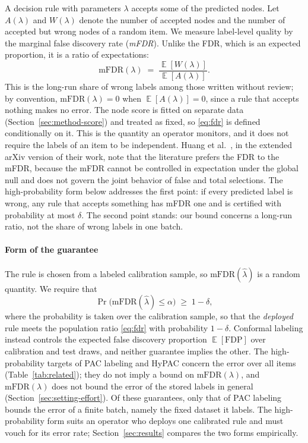 \documentclass[preprint,12pt]{elsarticle}
\theoremstyle{definition}
\newcommand{\fdr}{\mathrm{mFDR}}
\DeclareMathOperator{\E}{\mathbb{E}}
\begin{document}
A decision rule with parameters $\lambda$ accepts some of the predicted nodes.
Let $A(\lambda)$ and $W(\lambda)$ denote the number of accepted nodes and the
number of accepted but wrong nodes of a random item. We measure label-level
quality by the marginal false discovery rate (\emph{mFDR}). Unlike the FDR, which
is an expected proportion, it is a ratio of expectations:
\begin{equation}
  \fdr(\lambda) \;=\; \frac{\E[W(\lambda)]}{\E[A(\lambda)]}.
  \label{eq:fdr}
\end{equation}
This is the long-run share of wrong labels among those written without review;
by convention, $\fdr(\lambda)=0$ when $\E[A(\lambda)]=0$, since a rule that
accepts nothing makes no error. The node score is fitted on separate data
(Section~\ref{sec:method-score}) and treated as fixed, so \eqref{eq:fdr} is
defined conditionally on it. This is the quantity an operator monitors, and it
does not require the labels of an item to be independent.
Huang et al.~\cite{huang2025selective}, in the extended arXiv version of their work, note
that the literature prefers the FDR to the mFDR, because the mFDR cannot be
controlled in expectation under the global null and does not govern the joint
behavior of false and total selections. The high-probability form below
addresses the first point: if every predicted label is wrong, any rule that
accepts something has mFDR one and is certified with probability at most
$\delta$. The second point stands: our bound concerns a long-run ratio, not the
share of wrong labels in one batch.

\paragraph{Form of the guarantee}
The rule is chosen from a labeled calibration sample, so $\fdr(\hat\lambda)$ is
a random quantity. We require that
\begin{equation}
  \Pr\bigl(\fdr(\hat\lambda) \le \alpha\bigr) \;\ge\; 1-\delta ,
  \label{eq:guarantee}
\end{equation}
where the probability is taken over the calibration sample, so that the
\emph{deployed} rule meets the population ratio \eqref{eq:fdr} with probability
$1-\delta$. Conformal labeling \citep{huang2025selective} instead controls the
expected false discovery proportion $\E[\mathrm{FDP}]$ over calibration and test
draws, and neither guarantee implies the other. The high-probability targets of
PAC labeling \citep{candes2026pac} and HyPAC \citep{zeng2026hypac} concern the
error over all items (Table~\ref{tab:related}); they do not imply a bound on
$\fdr(\lambda)$, and $\fdr(\lambda)$ does not bound the error of the stored
labels in general (Section~\ref{sec:setting-effort}). Of these guarantees, only
that of PAC labeling bounds the error of a finite batch, namely the fixed
dataset it labels. The high-probability form suits an operator who deploys one
calibrated rule and must vouch for its error rate; Section~\ref{sec:results}
compares the two forms empirically.
\end{document}
